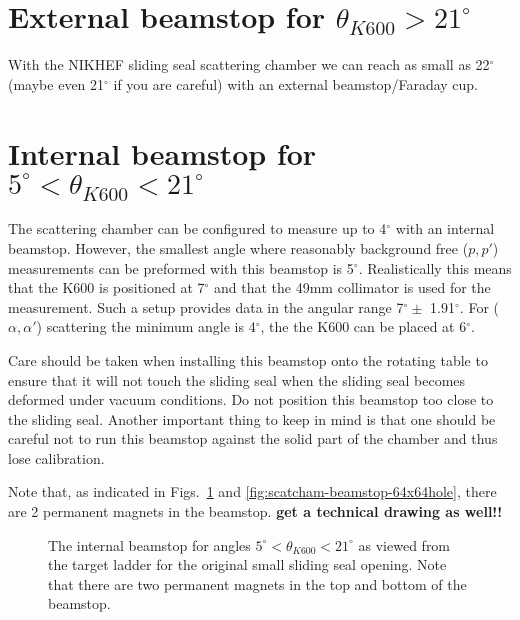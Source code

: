 \documentclass[11pt]{report}
\begin{document}
\section{External beamstop for $\theta_{K600} > 21^{\circ}$}
With the NIKHEF sliding seal scattering chamber we can reach as small as
22$^{\circ}$ (maybe even 21$^{\circ}$ if you are careful) with an external beamstop/Faraday cup.




\section{Internal beamstop for $5^{\circ}<\theta_{K600}<21^{\circ}$}

The scattering chamber can be configured to measure up to 4$^{\circ}$ with an internal
beamstop.  
However, the smallest angle where reasonably background free ($p,p'$) 
measurements can be preformed with this beamstop 
is 5$^{\circ}$. Realistically this means that the K600 is positioned
at 7$^{\circ}$ and that the 49mm collimator is used for the measurement. Such a setup
provides data in the angular range 7$^{\circ} \pm$ 1.91$^{\circ}$.
For ($\alpha,\alpha '$) scattering the minimum angle is 4$^{\circ}$, the the K600
can be placed at 6$^{\circ}$.

Care should be taken when installing this beamstop onto the rotating table
to ensure that it will not touch the
sliding seal when the sliding seal becomes deformed under vacuum conditions.
Do not position this beamstop too close to the sliding seal. Another important thing
to keep in mind is that one should be careful not to run this beamstop against
the solid part of the chamber and thus lose calibration.

Note that, as indicated in Figs.~\ref{fig:scatcham-beamstop-smallhole} and 
\ref{fig:scatcham-beamstop-64x64hole}, there are 2 permanent magnets in the
beamstop.
{\bf get a technical drawing as well!! }

\begin{figure}[!ht]
\centerline{\vspace{0cm}\hspace{0cm}
}
\centering
\caption{The internal beamstop for angles $5^{\circ}<\theta_{K600}<21^{\circ}$
 as viewed from the target ladder for the original small sliding seal opening. 
Note that there are two permanent magnets in the top and bottom of the beamstop.}
\label{fig:scatcham-beamstop-smallhole}
\end{figure} 
\end{document}
